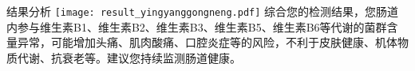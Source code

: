 \vspace*{6mm}
\fontsize{9.3pt}{11pt}\selectfont
\begin{spacing}{1.5}
\begin{LRaside}[.8]{结果分析}
\noindent
\texttt{[image: result\_yingyanggongneng.pdf]}
\asidebreak %
综合您的检测结果，您肠道内参与维生素B1、维生素B2、维生素B3、维生素B5、维生素B6等代谢的菌群含量异常，可能增加头痛、肌肉酸痛、口腔炎症等的风险，不利于皮肤健康、机体物质代谢、抗衰老等。建议您持续监测肠道健康。
\end{LRaside}
\end{spacing}



